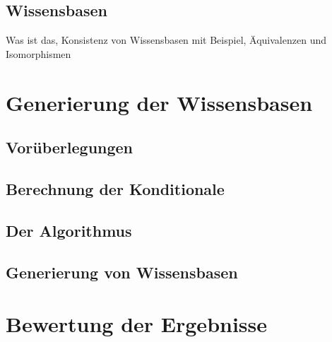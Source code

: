 \documentclass[12pt,a4paper]{article}
\begin{document}
\subsection{Wissensbasen}
Was ist das, Konsistenz von Wissensbasen mit Beispiel, Äquivalenzen und Isomorphismen
\section{Generierung der Wissensbasen}
\subsection{Vorüberlegungen}
\subsection{Berechnung der Konditionale}
\subsection{Der Algorithmus}
\subsection{Generierung von Wissensbasen}
\section{Bewertung der Ergebnisse}

\newpage

 
\end{document}
